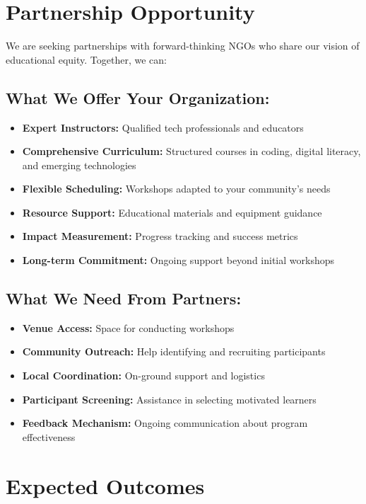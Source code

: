 \documentclass[12pt,a4paper]{article}
\begin{document}
\section{Partnership Opportunity}

We are seeking partnerships with forward-thinking NGOs who share our vision of educational equity. Together, we can:

\subsection{What We Offer Your Organization:}
\begin{itemize}[leftmargin=*]
    \item \textbf{Expert Instructors:} Qualified tech professionals and educators
    \item \textbf{Comprehensive Curriculum:} Structured courses in coding, digital literacy, and emerging technologies
    \item \textbf{Flexible Scheduling:} Workshops adapted to your community's needs
    \item \textbf{Resource Support:} Educational materials and equipment guidance
    \item \textbf{Impact Measurement:} Progress tracking and success metrics
    \item \textbf{Long-term Commitment:} Ongoing support beyond initial workshops
\end{itemize}

\subsection{What We Need From Partners:}
\begin{itemize}[leftmargin=*]
    \item \textbf{Venue Access:} Space for conducting workshops
    \item \textbf{Community Outreach:} Help identifying and recruiting participants
    \item \textbf{Local Coordination:} On-ground support and logistics
    \item \textbf{Participant Screening:} Assistance in selecting motivated learners
    \item \textbf{Feedback Mechanism:} Ongoing communication about program effectiveness
\end{itemize}

\section{Expected Outcomes}
\end{document}

